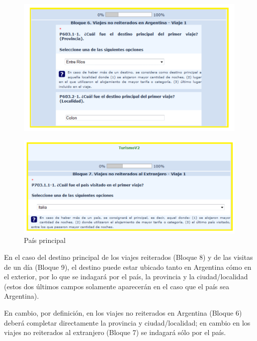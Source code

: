\documentclass[
  openany]{book}
\begin{document}
\begin{figure}

{\centering \includegraphics[width=1\linewidth]{imagenes/figura6-81} 

}

\end{figure}

\begin{figure}

{\centering \includegraphics[width=1\linewidth]{imagenes/figura6-82} 

}

\caption{País principal}\label{fig:viajeprincipal98}
\end{figure}

En el caso del destino principal de los viajes reiterados (Bloque 8) y de las visitas de un día (Bloque 9), el destino puede estar ubicado tanto en Argentina cómo en el exterior, por lo que se indagará por el país, la provincia y la ciudad/localidad (estos dos últimos campos solamente aparecerán en el caso que el país sea Argentina).

En cambio, por definición, en los viajes no reiterados en Argentina (Bloque 6) deberá completar directamente la provincia y ciudad/localidad; en cambio en los viajes no reiterados al extranjero (Bloque 7) se indagará sólo por el país.
\end{document}
